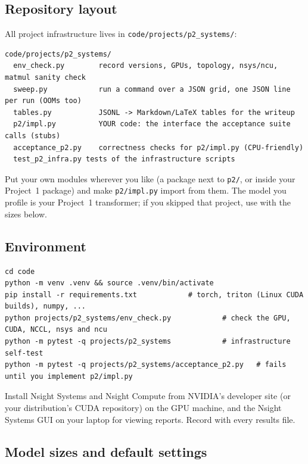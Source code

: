 \subsection{Repository layout}

All project infrastructure lives in \texttt{code/projects/p2\_systems/}:

\begin{lstlisting}[style=plain]
code/projects/p2_systems/
  env_check.py        record versions, GPUs, topology, nsys/ncu, matmul sanity check
  sweep.py            run a command over a JSON grid, one JSON line per run (OOMs too)
  tables.py           JSONL -> Markdown/LaTeX tables for the writeup
  p2/impl.py          YOUR code: the interface the acceptance suite calls (stubs)
  acceptance_p2.py    correctness checks for p2/impl.py (CPU-friendly)
  test_p2_infra.py tests of the infrastructure scripts
\end{lstlisting}

Put your own modules wherever you like (a package next to \texttt{p2/}, or inside your Project~1
package) and make \texttt{p2/impl.py} import from them. The model you profile is your Project~1
transformer; if you skipped that project, use  with the sizes below.

\subsection{Environment}

\begin{lstlisting}[style=shell]
cd code
python -m venv .venv && source .venv/bin/activate
pip install -r requirements.txt            # torch, triton (Linux CUDA builds), numpy, ...
python projects/p2_systems/env_check.py            # check the GPU, CUDA, NCCL, nsys and ncu
python -m pytest -q projects/p2_systems            # infrastructure self-test
python -m pytest -q projects/p2_systems/acceptance_p2.py   # fails until you implement p2/impl.py
\end{lstlisting}

Install Nsight Systems and Nsight Compute from NVIDIA's developer site (or your distribution's CUDA
repository) on the GPU machine, and the Nsight Systems GUI on your laptop for viewing reports.
Record  with every results file.

\subsection{Model sizes and default settings}

